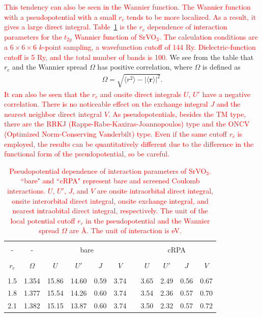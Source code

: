 \documentclass{article}
\newcommand{\tr}[1]{\textcolor{red}{#1}}
\begin{document}
\tr{This tendency can also be seen in the Wannier function. The Wannier function with a pseudopotential with a small $r_c$ tends to be more localized. As a result, it gives a large direct integral. Table~\ref{rc-vs-interaction} is the $r_c$ dependence of interaction parameters for the $t_{2g}$ Wannier function of SrVO$_3$. The calculation conditions are a $6\times6\times6$ $k$-point sampling, a wavefunction cutoff of 144 Ry. Dielectric-function cutoff is 5 Ry, and the total number of bands is 100.}
We see from the table that $r_c$ and the Wannier spread $\Omega$ has positive correlation, where $\Omega$ is defined as 
\begin{eqnarray}
\Omega=\sqrt{ \langle r^2 \rangle - |\langle \mathbf{r} \rangle|^2 }. \nonumber 
\end{eqnarray}
\tr{It can also be seen that the $r_c$ and onsite direct integrals $U$, $U'$ have a negative correlation. There is no noticeable effect on the exchange integral $J$ and the nearest neighbor direct integral $V$. As pseudopotentials, besides the TM type, there are the RRKJ (Rappe-Rabe-Kaxiras-Joannopoulos) type and the ONCV (Optimized Norm-Conserving Vanderbilt) type. Even if the same cutoff $r_c$ is employed, the results can be quantitatively different due to the difference in the functional form of the pseudopotential, so be careful.} 
\begin{table}[H] 
\begin{center}
\caption{\tr{Pseudopotential dependence of interaction parameters of SrVO$_3$. ``bare" and ``cRPA" represent bare and screened Coulomb interactions. $U$, $U'$, $J$, and $V$ are onsite intraorbital direct integral, onsite interorbital direct integral, onsite exchange integral, and nearest intraobital direct integral, respectively. The unit of the local potential cutoff $r_c$ in the pseudopotential and the Wannier spread $\Omega$ are \AA. The unit of interaction is eV.}}  
\label{rc-vs-interaction}
\vspace{0.3cm} 
\begin{tabular}{c c@{\ \ \ } c@{\ } c@{\ } c@{\ } c@{\ } c@{\ \ } c@{\ }c@{\ }c@{\ }c@{\ }} \hline \hline  \\ [-10pt]  
  -          &      -    &  \multicolumn{4}{c}{bare}   &  &   \multicolumn{4}{c}{cRPA}   \\ \hline \\ [-10pt]  
 $r_c$  & $\Omega$ &  $U$ &   $U'$ &  $J$ &  $V$ &  &   $U$ &   $U'$ &  $J$ &  $V$ \\ \hline \\ [-10pt] 
 1.5    &   1.354  & 15.86 & 14.60  & 0.59 & 3.74 &  &  3.65 &  2.49  & 0.56 & 0.67 \\ 
 1.8    &   1.377  & 15.54 & 14.26  & 0.60 & 3.74 &  &  3.54 &  2.36  & 0.57 & 0.70 \\ 
 2.1    &   1.382  & 15.15 & 13.87  & 0.60 & 3.74 &  &  3.50 &  2.32  & 0.57 & 0.72 \\  \hline \hline
\end{tabular} 
\end{center}
\end{table} 
\end{document}
